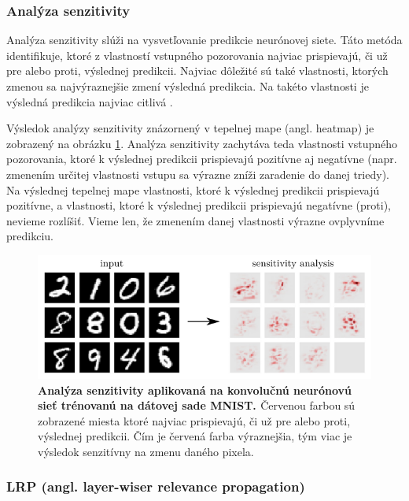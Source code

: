\subsubsection{Analýza senzitivity}

Analýza senzitivity slúži na vysvetľovanie predikcie neurónovej siete. Táto metóda identifikuje, ktoré z vlastností vstupného pozorovania najviac prispievajú, či už pre alebo proti, výslednej predikcii. Najviac dôležité sú také vlastnosti, ktorých zmenou sa najvýraznejšie zmení výsledná predikcia. Na takéto vlastnosti je výsledná predikcia najviac citlivá \cite{montavon2018methods}.

Výsledok analýzy senzitivity znázornený v tepelnej mape (angl. heatmap) je zobrazený na obrázku \ref{fig:sensitivity_analysis}. Analýza senzitivity zachytáva teda vlastnosti vstupného pozorovania, ktoré k výslednej predikcii prispievajú pozitívne aj negatívne (napr. zmenením určitej vlastnosti vstupu sa výrazne zníži zaradenie do danej triedy). Na výslednej tepelnej mape vlastnosti, ktoré k výslednej predikcii prispievajú pozitívne, a vlastnosti, ktoré k výslednej predikcii prispievajú negatívne (proti), nevieme rozlíšiť. Vieme len, že zmenením danej vlastnosti výrazne ovplyvníme predikciu.

\begin{figure}[h!]
\centering
\includegraphics[scale=0.5]{assets/images/sensitivity_analysis.png}
\caption{\textbf{Analýza senzitivity aplikovaná na konvolučnú neurónovú sieť trénovanú na dátovej sade MNIST. \cite{montavon2018methods}} Červenou farbou sú zobrazené miesta ktoré najviac prispievajú, či už pre alebo proti, výslednej predikcii. Čím je červená farba výraznejšia, tým viac je výsledok senzitívny na zmenu daného pixela.}
\label{fig:sensitivity_analysis}
\end{figure}

\subsubsection{LRP (angl. layer-wiser relevance propagation)}

